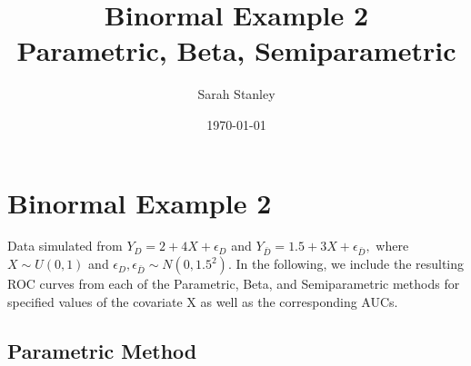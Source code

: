 \documentclass[10pt, title page]{article}\usepackage[]{graphicx}\usepackage[]{color}
\title{\LARGE {Binormal Example 2} \\ \vspace{.5 cm} {Parametric, Beta, Semiparametric} }
\author{Sarah Stanley}
\date{\today}
\makeatletter
\newenvironment{kframe}{%
 \def\at@end@of@kframe{}%
 \ifinner\ifhmode%
  \def\at@end@of@kframe{\end{minipage}}%
  \begin{minipage}{\columnwidth}%
 \fi\fi%
 \def\FrameCommand##1{\hskip\@totalleftmargin \hskip-\fboxsep
 \colorbox{shadecolor}{##1}\hskip-\fboxsep
     \hskip-\linewidth \hskip-\@totalleftmargin \hskip\columnwidth}%
 \MakeFramed {\advance\hsize-\width
   \@totalleftmargin\z@ \linewidth\hsize
   \@setminipage}}%
 {\par\unskip\endMakeFramed%
 \at@end@of@kframe}
\newenvironment{knitrout}{}{} %
\makeatother
\begin{document}
\section{Binormal Example 2}
Data simulated from $Y_D = 2 + 4X + \epsilon_D$ and $Y_{\bar{D}} = 1.5 + 3X + \epsilon_{\bar{D}},$ where $X \sim U(0,1)$ and $\epsilon_D, \epsilon_{\bar{D}} \sim N(0,1.5^2).$  In the following, we include the resulting ROC curves from each of the Parametric, Beta, and Semiparametric methods for specified values of the covariate X as well as the corresponding AUCs.
\subsection{Parametric Method}



\begin{knitrout}
\color{fgcolor}\begin{kframe}


{\ttfamily\noindent\bfseries{}}

{\ttfamily\noindent\bfseries\color{errorcolor}{\#\# Error in library(ROCRegression): there is no package called 'ROCRegression'}}\end{kframe}
\end{knitrout}
\end{document}
